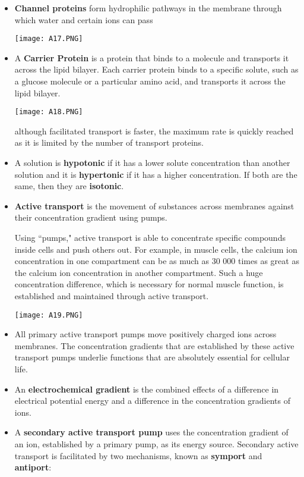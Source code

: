 \documentclass[letterpaper]{article}
\begin{document}
\begin{itemize}
\item \textbf{Channel proteins} form hydrophilic pathways in the membrane through which water and certain ions can pass
\begin{center}\texttt{[image: A17.PNG]}\end{center}
\item A \textbf{Carrier Protein} is a protein that binds to a molecule and transports it across the lipid bilayer. Each carrier protein binds to a specific solute, such as a glucose molecule or a particular amino acid, and transports it across the lipid bilayer.
\begin{center}\texttt{[image: A18.PNG]}\end{center}
although facilitated transport is faster, the maximum rate is quickly reached as it is limited by the number of transport proteins.
\item A solution is \textbf{hypotonic} if it has a lower solute concentration than another solution and it is \textbf{hypertonic} if it has a higher concentration. If both are the same, then they are \textbf{isotonic}.
\item \textbf{Active transport} is the movement of substances across membranes against their concentration gradient using pumps.
\begin{idea}
    Using ``pumps," active transport is able to concentrate specific compounds inside cells and push others out. For example, in muscle cells, the calcium ion concentration in one compartment can be as much as 30 000 times as great as the calcium ion concentration in another compartment. Such a huge concentration difference, which is necessary for normal muscle function, is established and maintained through active transport.
\end{idea}
\begin{center}\texttt{[image: A19.PNG]}\end{center}
\item All primary active transport pumps move positively charged ions across membranes. The concentration gradients that are established by these active transport pumps underlie functions that are absolutely essential for cellular life.
\item An \textbf{electrochemical gradient} is the combined effects of a difference in electrical potential energy and a difference in the concentration gradients of ions.
\item A \textbf{secondary active transport pump} uses the concentration gradient of an ion, established by a primary pump, as its energy source. Secondary active transport is facilitated by two mechanisms, known as \textbf{symport} and \textbf{antiport}:

\end{itemize}
\end{document}
